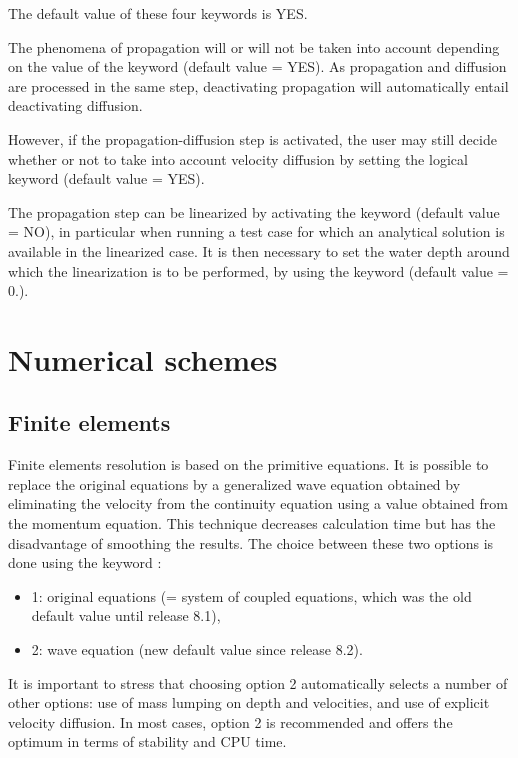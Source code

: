 The default value of these four keywords is YES.

The phenomena of propagation will or will not be taken into account depending
on the value of the keyword  (default value = YES).
As propagation and diffusion are processed in the same step,
deactivating propagation will automatically entail deactivating diffusion.

However, if the propagation-diffusion step is activated, the user may still
decide whether or not to take into account velocity diffusion by setting
the logical keyword  (default value = YES).

The propagation step can be linearized by activating the keyword
 (default value = NO), in particular when running
a test case for which an analytical solution is available in the linearized case.
It is then necessary to set the water depth around which the
linearization is to be performed, by using the keyword
 (default value = 0.).


\section{Numerical schemes}

\subsection{Finite elements}
Finite elements resolution is based on the primitive equations.
It is possible to replace the original equations by a generalized wave equation
obtained by eliminating the velocity from the continuity equation using a value
obtained from the momentum equation.
This technique decreases calculation time but has the disadvantage
of smoothing the results.
The choice between these two options is done using the keyword
:
\begin{itemize}
\item 1: original equations (= system of coupled equations,
which was the old default value until release 8.1),
\item 2: wave equation (new default value since release 8.2).
\end{itemize}
It is important to stress that choosing option 2 automatically selects
a number of other options:
use of mass lumping on depth and velocities, and use of explicit velocity
diffusion.
In most cases, option 2 is recommended and offers the optimum in terms of
stability and CPU time.

